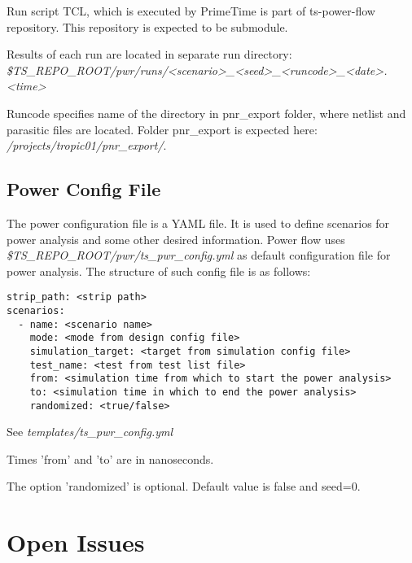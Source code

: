 \documentclass{tropic_design_spec}
\begin{document}
\vspace{.5cm}

Run script TCL, which is executed by PrimeTime is part of ts-power-flow repository. This repository
is expected to be submodule.

Results of each run are located in separate run directory:\\
\textit{\$TS_REPO_ROOT/pwr/runs/<scenario>_<seed>_<runcode>_<date>.<time>}

\vspace{.5cm}

Runcode specifies name of the directory in pnr_export folder, where netlist and parasitic files
are located. Folder pnr_export is expected here: \textit{/projects/tropic01/pnr_export/}.


\subsection{Power Config File}

The power configuration file is a YAML file. It is used to define scenarios for power analysis and some
other desired information. Power flow uses \textit{\$TS_REPO_ROOT/pwr/ts_pwr_config.yml} as default
configuration file for power analysis. The structure of such config file is as follows:

\begin{lstlisting}
strip_path: <strip path>
scenarios:
  - name: <scenario name>
    mode: <mode from design config file>
    simulation_target: <target from simulation config file>
    test_name: <test from test list file>
    from: <simulation time from which to start the power analysis>
    to: <simulation time in which to end the power analysis>
    randomized: <true/false>
\end{lstlisting}

See \textit{templates/ts_pwr_config.yml}

\vspace{.5cm}

Times 'from' and 'to' are in nanoseconds.

\vspace{.5cm}

The option 'randomized' is optional. Default value is false and seed=0.

\pagebreak
\section{Open Issues}

\PrintOpenIssueSummary
\end{document}
